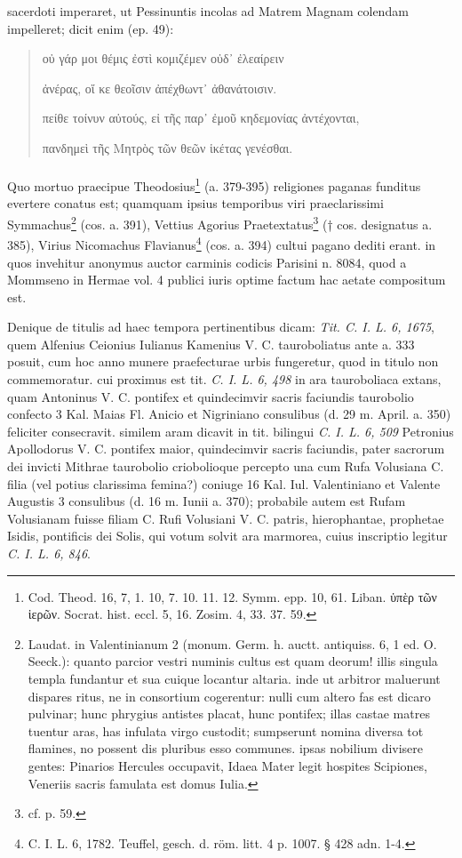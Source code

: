 \documentclass[a4paper, 11pt, oneside, polutonikogreek, german]{article}
\begin{document}
sacerdoti imperaret, ut Pessinuntis incolas ad Matrem Magnam colendam impelleret; dicit enim (ep. 49):
\begin{quotation}
\hspace*{5mm}οὐ γάρ μοι θέμις ἐστὶ κομιζέμεν οὐδ᾽ ἐλεαίρειν

\hspace*{5mm}ἀνέρας, οἵ κε θεοῖσιν ἀπέχθωντ᾽ ἀθανάτοισιν.

πείθε τοίνυν αὐτούς, εἰ τῆς παρ᾽ ἐμοῦ κηδεμονίας ἀντέχονται,

πανδημεὶ τῆς Μητρὸς τῶν θεῶν ἱκέτας γενέσθαι.
\end{quotation}
\paragraph{}
Quo mortuo praecipue Theodosius\footnote{Cod. Theod. 16, 7, 1. 10, 7. 10. 11. 12. Symm. epp. 10, 61. Liban. ὑπὲρ τῶν ἱερῶν. Socrat. hist. eccl. 5, 16. Zosim. 4, 33. 37. 59.} (a. 379-395) religiones paganas funditus evertere conatus est; quamquam ipsius temporibus viri praeclarissimi Symmachus\footnote{Laudat. in Valentinianum 2 (monum. Germ. h. auctt. antiquiss. 6, 1 ed. O. Seeck.): quanto parcior vestri numinis cultus est quam deorum! illis singula templa fundantur et sua cuique locantur altaria. inde ut arbitror maluerunt dispares ritus, ne in consortium cogerentur: nulli cum altero fas est dicaro pulvinar; hunc phrygius antistes placat, hunc pontifex; illas castae matres tuentur aras, has infulata virgo custodit; sumpserunt nomina diversa tot flamines, no possent dis pluribus esso communes. ipsas nobilium divisere gentes: Pinarios Hercules occupavit, Idaea Mater legit hospites Scipiones, Veneriis sacris famulata est domus Iulia.} (cos. a. 391), Vettius Agorius Praetextatus\footnote{cf. p. 59.} († cos. designatus a. 385), Virius Nicomachus Flavianus\footnote{C. I. L. 6, 1782. Teuffel, gesch. d. röm. litt. 4 p. 1007. § 428 adn. 1-4.} (cos. a. 394) cultui pagano dediti erant. in quos invehitur anonymus auctor carminis codicis Parisini n. 8084, quod a Mommseno in Hermae vol. 4 publici iuris optime factum hac aetate compositum est.

Denique de titulis ad haec tempora pertinentibus dicam: \emph{Tit. C. I. L. 6, 1675}, quem Alfenius Ceionius Iulianus Kamenius V. C. tauroboliatus ante a. 333 posuit, cum hoc anno munere praefecturae urbis fungeretur, quod in titulo non commemoratur. cui proximus est tit. \emph{C. I. L. 6, 498} in ara tauroboliaca extans, quam Antoninus V. C. pontifex et quindecimvir sacris faciundis taurobolio confecto 3 Kal. Maias Fl. Anicio et Nigriniano consulibus (d. 29 m. April. a. 350) feliciter consecravit. similem aram dicavit in tit. bilingui \emph{C. I. L. 6, 509} Petronius Apollodorus V. C. pontifex maior, quindecimvir sacris faciundis, pater sacrorum dei invicti Mithrae taurobolio criobolioque percepto una cum Rufa Volusiana C. filia (vel potius clarissima femina?) coniuge 16 Kal. Iul. Valentiniano et Valente Augustis 3 consulibus (d. 16 m. Iunii a. 370); probabile autem est Rufam Volusianam fuisse filiam C. Rufi Volusiani V. C. patris, hierophantae, prophetae Isidis, pontificis dei Solis, qui votum solvit ara marmorea, cuius inscriptio legitur \emph{C. I. L. 6, 846}.
\end{document}
